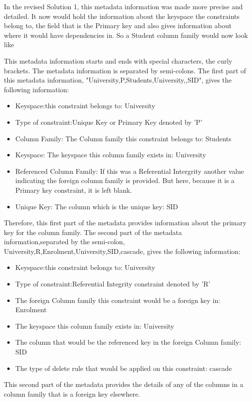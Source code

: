 In the revised Solution 1, this metadata information was made more precise and
detailed. It now would hold the information about the keyspace the constraints
belong to, the field that is the Primary key and also gives information about
where it would have dependencies in. So a Student column family would now look
like

This metadata information starts and ends with special characters, the curly
brackets. The metadata information is separated by semi-colons. The first part
of this metadata information, "University,P,Students,University,,SID", gives the
following information:
\begin{itemize}
\item Keyspace:this constraint belongs to: University
\item Type of constraint:Unique Key or Primary Key denoted by 'P'
\item Column Family: The Column family this constraint belongs to: Students
\item Keyspace: The keyspace this column family exists in: University
\item Referenced Column Family: If this was a Referential Intergrity another
value indicating the foreign column family is provided. But here, because it is a Primary key constraint, it
is left blank.
\item Unique Key: The column which is the unique key: SID
\end{itemize}

Therefore, this first part of the
metadata provides information about the primary key for the column family.
The second part of the metadata information,separated by the semi-colon,
University,R,Enrolment,University,SID,cascade, gives the following information:

\begin {itemize}
\item Keyspace:this constraint belongs to: University
\item Type of constraint:Referential Integrity constraint denoted by 'R'
\item The foreign Column family this
constraint would be a foreign key in: Enrolment
\item The keyspace this column family exists in: University
\item The column that would be the referenced key in the foreign Column family:
SID
\item The type of delete rule that would be applied on this constraint:
cascade
\end{itemize}
This second part of the metadata provides the details of any of the columns in a
column family that is a foreign key elsewhere.

